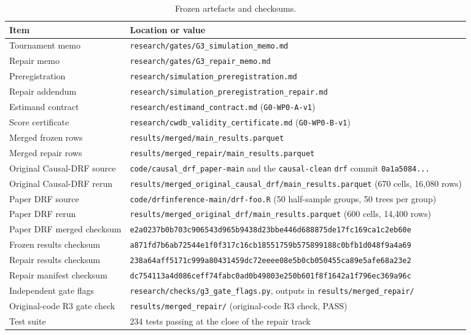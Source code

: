 \documentclass[11pt,a4paper]{article}
\theoremstyle{definition}
\theoremstyle{remark}
\begin{document}
\begin{table}[htbp]
\centering
\caption{Frozen artefacts and checksums.}
\label{tab:artefacts}
\small
\begin{tabular}{@{}lp{9.2cm}@{}}
\toprule
Item & Location or value \\
\midrule
Tournament memo & \texttt{research/gates/G3\_simulation\_memo.md} \\
Repair memo & \texttt{research/gates/G3\_repair\_memo.md} \\
Preregistration & \texttt{research/simulation\_preregistration.md} \\
Repair addendum & \texttt{research/simulation\_preregistration\_repair.md} \\
Estimand contract & \texttt{research/estimand\_contract.md} (\texttt{G0-WP0-A-v1}) \\
Score certificate & \texttt{research/cwdb\_validity\_certificate.md} (\texttt{G0-WP0-B-v1}) \\
Merged frozen rows & \texttt{results/merged/main\_results.parquet} \\
Merged repair rows & \texttt{results/merged\_repair/main\_results.parquet} \\
Original Causal-DRF source & \texttt{code/causal\_drf\_paper-main} and the \texttt{causal-clean} \texttt{drf} commit \texttt{0a1a5084...} \\
Original Causal-DRF rerun & \texttt{results/merged\_original\_causal\_drf/main\_results.parquet} (670 cells, 16,080 rows) \\
Paper DRF source & \texttt{code/drfinference-main/drf-foo.R} (50 half-sample groups, 50 trees per group) \\
Paper DRF rerun & \texttt{results/merged\_original\_drf/main\_results.parquet} (600 cells, 14,400 rows) \\
Paper DRF merged checksum & \texttt{e2a0237b0b703c906543d965b9438d23\allowbreak bbe446d688875de17fc169ca1c2eb60e} \\
Frozen results checksum & \texttt{a871fd7b6ab72544e1f0f317c16cb185\allowbreak 51759b575899188c0bfb1d048f9a4a69} \\
Repair results checksum & \texttt{238a64aff5171c999a80431459dc72ee\allowbreak ee08e5b0cb050455ca89e5afe68a23e2} \\
Repair manifest checksum & \texttt{dc754113a4d086ceff74fabc0ad0b498\allowbreak 03e250b601f8f1642a1f796ec369a96c} \\
Independent gate flags & \texttt{research/checks/g3\_gate\_flags.py}, outputs in \texttt{results/merged\_repair/} \\
Original-code R3 gate check & \texttt{results/merged\_repair/} (original-code R3 check, PASS) \\
Test suite & 234 tests passing at the close of the repair track \\
\bottomrule
\end{tabular}
\end{table}
\end{document}
